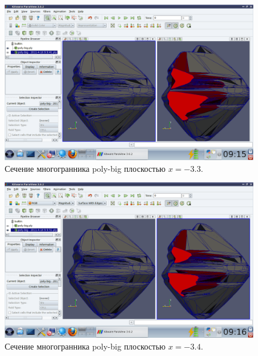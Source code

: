 \documentclass[a4paper,12pt, titlepage]{article}
\begin{document}
	\begin{flushleft}
		\begin{figure}[h]
		    \includegraphics[trim = 220 65 10 140, clip, width=15cm]{poly-big/33.png}
		    \caption{Сечение многогранника poly-big плоскостью $x = -3.3$.}
		    \label{poly-big-3}
		\end{figure}

	\end{flushleft}
	\begin{flushleft}
		\begin{figure}[h]
		    \includegraphics[trim = 220 65 10 140, clip, width=15cm]{poly-big/34.png}
		    \caption{Сечение многогранника poly-big плоскостью $x = -3.4$.}
		    \label{poly-big-4}
		\end{figure}
	\end{flushleft}
\end{document}
